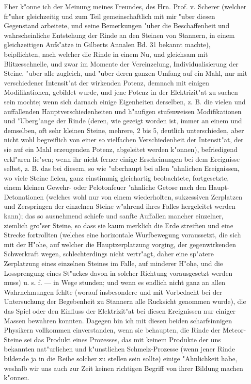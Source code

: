 \documentclass[a4paper, 11pt, oneside, german]{article}
\begin{document}
{\hspace*{6mm}Eher k"onne ich der Meinung meines Freundes, des Hrn. Prof. v. Scherer (welcher fr"uher gleichzeitig und zum Teil gemeinschaftlich mit mir "uber diesen Gegenstand arbeitete, und seine Bemerkungen "uber die Beschaffenheit und wahrscheinliche Entstehung der Rinde an den Steinen von Stannern, in einem gleichzeitigen Aufs"atze in Gilberts Annalen Bd. 31 bekannt machte), beipflichten, nach welcher die Rinde in einem Nu, und gleichsam mit Blitzesschnelle, und zwar im Momente der Vereinzelung, Individualisierung der Steine, "uber alle zugleich, und "uber deren ganzen Umfang auf ein Mahl, nur mit verschiedener Intensit"at der wirkenden Potenz, demnach mit einigen Modifikationen, gebildet wurde, und jene Potenz in der Elektrizit"at zu suchen sein mochte; wenn sich darnach einige Eigenheiten derselben, z. B. die vielen und auffallenden Hauptverschiedenheiten und h"aufigen stufenweisen Modifikationen und "Uberg"ange der Rinde (deren, wie gezeigt worden ist, immer an einem und demselben, oft sehr kleinen Steine, mehrere, 2 bis 5, deutlich unterschieden, aber nicht wohl begreiflich von einer so vielfachen Verschiedenheit der Intensit"at, der sie auf ein Mahl erzeugenden Potenz, abgeleitet werden k"onnen), befriedigend erkl"aren lie"sen; wenn ihr nicht ferner einige Erscheinungen bei dem Ereignisse selbst, z. B. das bei diesem, so wie "uberhaupt bei allen "ahnlichen Ereignissen, wo viele Steine fielen, ganz einstimmig gleichartig beobachtete, fortgesetzte, einem kleinen Gewehr- oder Pelotonfeuer "ahnliche Getose nach den Haupt-Detonationen (welches wohl nur von einem wiederholten, sukzessiven Zerplatzen und Zerspringen der einzelnen Steine w"ahrend ihres Falles hergeleitet werden kann); das so ausnehmend schiefe und sanfte Auffallen mancher einzelner, ziemlich gro"ser Steine, so dass sie kaum merklich die Erde streiften und eine Strecke fortrollten (welches eine horizontale Wurfbewegung voraussetzt, die sich mit der H"ohe, auf welcher die Hauptzerplatzung vorging, der gegenwirkenden Schwerkraft wegen, schlechterdings nicht vertr"agt, daher eine sp"atere Zerplatzung eines einzelnen Steines im Falle, auf minderer H"ohe, und die Lossprengung eines St"uckes davon in solcher Richtung vorausgesetzt werden muss) u. s. f. --- in Wege stunden; und wenn es endlich nicht ganz an allen Wahrnehmungen fehlte (worauf insbesondere und mit Vorbedacht bei der Untersuchung der Begebenheit zu Stannern alle Rucksicht genommen wurde), die das Spiel oder den Einfluss der Elektrizit"at bei diesen Ereignissen nur einiger Massen bewahren konnten. Dagegen bin ich mit diesen beiden scharfsinnigen Physikern vollkommen einverstanden, wenn sie behaupten, die Rinde der Meteor-Steine sei das Produkt eines Prozesses, das mit keinem Produkte der uns bekannten nat"urlichen und k"unstlichen Schmelz-Prozesse (wenn jener Rinde bildende ja in die Reihe solcher zu stellen sein sollte) einige "Ahnlichkeit habe, weshalb wir uns auch zur Zeit keinen richtigen Begriff von ihrer Bildung machen k"onnen.}
\clearpage
\end{document}
